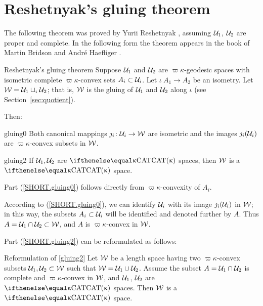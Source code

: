 \section{Reshetnyak's gluing theorem}\label{sec:cba-gluing}

The following theorem was proved by Yurii Reshetnyak \cite{reshetnyak:major}, assuming $\mathcal{U}_1$, $\mathcal{U}_2$ are proper and complete. 
In the following form the theorem appears in the book of Martin Bridson and Andr\'e Haefliger \cite{bridson-haefliger}.

\begin{thm}{Reshetnyak's gluing theorem}\label{thm:gluing}
Suppose 
$\mathcal{U}_1$ and $\mathcal{U}_2$ are %
$\varpi\kappa$-geodesic spaces 
with isometric complete $\varpi\kappa$-convex sets $A_i\subset\spc{U}_i$.  Let $\iota\:A_1\to A_2$ be an isometry.
Let $\mathcal{W}=\mathcal{U}_1\sqcup_{\upiota}\mathcal{U}_2$;
that is, $\mathcal{W}$ is the gluing of $\mathcal{U}_1$ and  $\mathcal{U}_2$ along $\iota$ (see Section~\ref{sec:quotient}).

Then: 
\begin{subthm}{gluing0}
Both canonical mappings $\jmath_i\:\spc{U}_i\to\spc{W}$ are isometric 
and the images $\jmath_i(\mathcal{U}_i)$ are $\varpi\kappa$-convex subsets in $\mathcal{W}$.
\end{subthm}

\begin{subthm}{gluing2}
If $\mathcal{U}_1, \mathcal{U}_2$ are $\CAT\kappa$ spaces,
then $\mathcal{W}$ is a $\CAT\kappa$ space.
\end{subthm} 
\end{thm}

Part (\ref{SHORT.gluing0})
follows directly from $\varpi\kappa$-convexity of $A_i$.

According to (\ref{SHORT.gluing0}),
we can identify $\mathcal{U}_i$ with its image $\jmath_i(\mathcal{U}_i)$ in $\mathcal{W}$;
in this way, the subsets $A_i\subset \spc{U}_i$ will be identified and denoted further by $A$.
Thus   $A=\spc{U}_1\cap \spc{U}_2\subset \spc{W}$,
and $A$ is $\varpi\kappa$-convex in $\mathcal{W}$.

Part (\ref{SHORT.gluing2}) can be reformulated as follows:

\begin{thm}{Reformulation of \ref{gluing2}}
Let $\mathcal{W}$ be a 
length space having two 
$\varpi\kappa$-convex subsets $\spc{U}_1,\spc{U}_2\subset\spc{W}$ such that
$\spc{W}=\spc{U}_1\cup\spc{U}_2$.
Assume the subset $A=\spc{U}_1\cap \spc{U}_2$ is complete and $\varpi\kappa$-convex in $\mathcal{W}$, and $\mathcal{U}_1$, $\mathcal{U}_2$ are $\CAT\kappa$ spaces.
Then $\mathcal{W}$ is a $\CAT\kappa$ space.
\end{thm}


